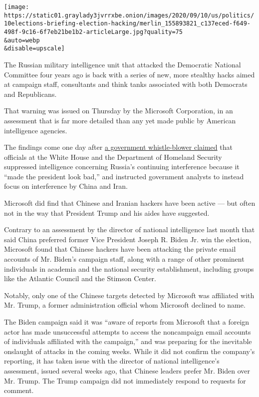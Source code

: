 \texttt{[image: https://static01.graylady3jvrrxbe.onion/images/2020/09/10/us/politics/10elections-briefing-election-hacking/merlin\_155893821\_c137eced-f649-498f-9c16-6f7eb21be1b2-articleLarge.jpg?quality=75\\\&auto=webp\\\&disable=upscale]}

The Russian military intelligence unit that attacked the Democratic
National Committee four years ago is back with a series of new, more
stealthy hacks aimed at campaign staff, consultants and think tanks
associated with both Democrats and Republicans.

That warning was issued on Thursday by the Microsoft Corporation, in an
assessment that is far more detailed than any yet made public by
American intelligence agencies.

The findings come one day after
\href{https://www.nytimes3xbfgragh.onion/2020/09/09/us/politics/homeland-security-russia-trump.html}{a
government whistle-blower claimed} that officials at the White House and
the Department of Homeland Security suppressed intelligence concerning
Russia's continuing interference because it ``made the president look
bad,'' and instructed government analysts to instead focus on
interference by China and Iran.

Microsoft did find that Chinese and Iranian hackers have been active ---
but often not in the way that President Trump and his aides have
suggested.

Contrary to an assessment by the director of national intelligence last
month that said China preferred former Vice President Joseph R. Biden
Jr. win the election, Microsoft found that Chinese hackers have been
attacking the private email accounts of Mr. Biden's campaign staff,
along with a range of other prominent individuals in academia and the
national security establishment, including groups like the Atlantic
Council and the Stimson Center.

Notably, only one of the Chinese targets detected by Microsoft was
affiliated with Mr. Trump, a former administration official whom
Microsoft declined to name.

The Biden campaign said it was ``aware of reports from Microsoft that a
foreign actor has made unsuccessful attempts to access the noncampaign
email accounts of individuals affiliated with the campaign,'' and was
preparing for the inevitable onslaught of attacks in the coming weeks.
While it did not confirm the company's reporting, it has taken issue
with the director of national intelligence's assessment, issued several
weeks ago, that Chinese leaders prefer Mr. Biden over Mr. Trump. The
Trump campaign did not immediately respond to requests for comment.

